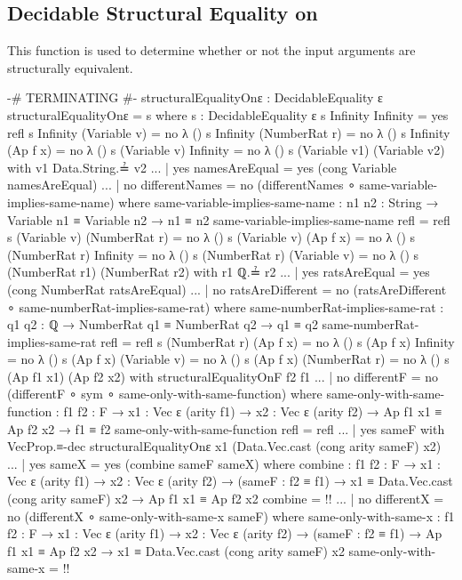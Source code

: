 \documentclass{report}
\begin{document}
\subsection{Decidable Structural Equality on }
This function is used to determine whether or not the input arguments are structurally equivalent.

\begin{code}
{-# TERMINATING #-}
structuralEqualityOnε : DecidableEquality ε
structuralEqualityOnε = s
  where
  s : DecidableEquality ε
  s Infinity Infinity = yes refl
  s Infinity (Variable v) = no λ ()
  s Infinity (NumberRat r) = no λ ()
  s Infinity (Ap f x) = no λ ()
  s (Variable v) Infinity = no λ ()
  s (Variable v1) (Variable v2) with v1 Data.String.≟ v2
  ... | yes namesAreEqual = yes (cong Variable namesAreEqual)
  ... | no differentNames = no (differentNames ∘ same-variable-implies-same-name)
    where
    same-variable-implies-same-name :
      {n1 n2 : String} →
      Variable n1 ≡ Variable n2 →
      n1 ≡ n2
    same-variable-implies-same-name refl = refl
  s (Variable v) (NumberRat r) = no λ ()
  s (Variable v) (Ap f x) = no λ ()
  s (NumberRat r) Infinity = no λ ()
  s (NumberRat r) (Variable v) = no λ ()
  s (NumberRat r1) (NumberRat r2) with r1 ℚ.≟ r2
  ... | yes ratsAreEqual = yes (cong NumberRat ratsAreEqual)
  ... | no ratsAreDifferent = no (ratsAreDifferent ∘ same-numberRat-implies-same-rat)
    where
    same-numberRat-implies-same-rat :
      {q1 q2 : ℚ} →
      NumberRat q1 ≡ NumberRat q2 →
      q1 ≡ q2
    same-numberRat-implies-same-rat refl = refl
  s (NumberRat r) (Ap f x) = no λ ()
  s (Ap f x) Infinity = no λ ()
  s (Ap f x) (Variable v) = no λ ()
  s (Ap f x) (NumberRat r) = no λ ()
  s (Ap f1 x1) (Ap f2 x2) with structuralEqualityOnF f2 f1
  ... | no differentF = no (differentF ∘ sym ∘ same-only-with-same-function)
    where
    same-only-with-same-function :
      {f1 f2 : F} →
      {x1 : Vec ε (arity f1)} →
      {x2 : Vec ε (arity f2)} →
      Ap f1 x1 ≡ Ap f2 x2 →
      f1 ≡ f2
    same-only-with-same-function refl = refl
  ... | yes sameF with VecProp.≡-dec structuralEqualityOnε
                                     x1 (Data.Vec.cast (cong arity sameF) x2)
  ... | yes sameX = yes (combine sameF sameX)
    where
    combine :
      {f1 f2 : F} →
      {x1 : Vec ε (arity f1)} →
      {x2 : Vec ε (arity f2)} →
      (sameF : f2 ≡ f1) →
      x1 ≡ Data.Vec.cast (cong arity sameF) x2 →
      Ap f1 x1 ≡ Ap f2 x2
    combine = {!!}
  ... | no differentX = no (differentX ∘ same-only-with-same-x sameF)
    where
    same-only-with-same-x :
      {f1 f2 : F} →
      {x1 : Vec ε (arity f1)} →
      {x2 : Vec ε (arity f2)} →
      (sameF : f2 ≡ f1) →
      Ap f1 x1 ≡ Ap f2 x2 →
      x1 ≡ Data.Vec.cast (cong arity sameF) x2
    same-only-with-same-x = {!!}
\end{code}
\end{document}
